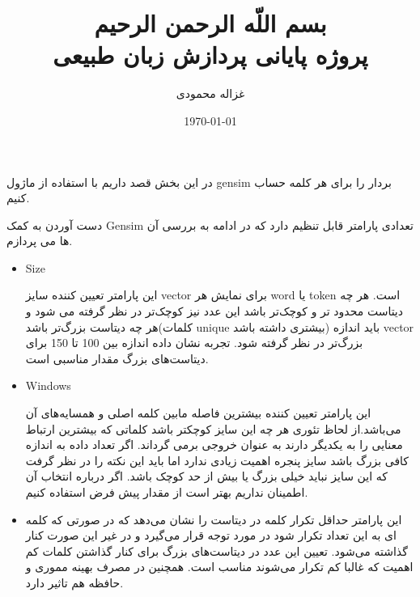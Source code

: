 \documentclass[10pt]{article}
\begin{document}
\title{بسم اللّه الرحمن الرحیم
	\\[25pt]	پروژه پایانی پردازش زبان طبیعی
}
\author{غزاله محمودی}

\date{\today}
\maketitle
\newpage

\tableofcontents
\newpage

\listoffigures
\newpage

	
\section{ 
}
در این بخش قصد داریم با استفاده از ماژول gensim بردار
  را برای هر کلمه حساب کنیم. 

دست آوردن
 به کمک Gensim تعدادی پارامتر قابل تنظیم دارد که در ادامه به بررسی آن ها می پردازم.

\begin{itemize}
	\item Size 
	
	این پارامتر تعیین کننده سایز vector برای نمایش هر word یا token است. هر چه دیتاست محدود تر و کوچک‌تر باشد این عدد نیز کوچک‌تر در نظر گرفته می شود و هر چه دیتاست بزرگ‌تر باشد(کلمات unique بیشتری داشته باشد) باید اندازه vector بزرگ‌تر در نظر گرفته شود. تجربه نشان داده اندازه بین 100 تا 150 برای دیتاست‌های بزرگ مقدار مناسبی است.
	
	\item Windows 
	
	این پارامتر تعیین کننده بیشترین فاصله مابین کلمه اصلی و همسایه‌های آن می‌باشد.از لحاظ تئوری هر چه این سایز کوچکتر باشد کلماتی که بیشترین ارتباط معنایی را به یکدیگر دارند به عنوان خروجی برمی گرداند. اگر تعداد داده به اندازه کافی بزرگ باشد سایز پنجره اهمیت زیادی ندارد اما باید این نکته را در نظر گرفت که این سایز نباید خیلی بزرگ یا بیش از حد کوچک باشد. اگر درباره انتخاب آن اطمینان نداریم بهتر است از مقدار پیش فرض استفاده کنیم.
	
	
	\item {}
	
	این پارامتر حداقل تکرار کلمه در دیتاست را نشان می‌دهد که در صورتی که کلمه ای به این تعداد تکرار شود در
	 مورد توجه قرار می‌گیرد و در غیر این صورت کنار گذاشته می‌شود. تعیین این عدد در دیتاست‌های بزرگ برای کنار گذاشتن کلمات کم اهمیت که غالبا کم تکرار می‌شوند مناسب است. همچنین در مصرف بهینه مموری و حافظه هم تاثیر دارد.
	
	 
	
\end{itemize}
\end{document}

